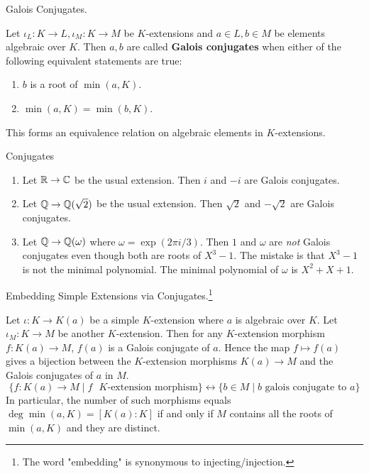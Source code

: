 \documentclass[../book.tex]{subfiles}
\begin{document}
\begin{dfn} Galois Conjugates.

    Let $\iota_L : K \to L, \iota_M : K \to M$ be $K$-extensions and
    $a \in L, b \in M$ be elements algebraic over $K$. 
    Then $a, b$ are called \textbf{Galois conjugates} when
    either of the following equivalent statements are true: 
    \begin{enumerate}
        \item $b$ is a root of $\min(a,K)$.
        \item $\min(a,K) = \min(b,K)$.
    \end{enumerate}
    This forms an equivalence relation on algebraic elements in $K$-extensions.
\end{dfn}
\begin{eg} Conjugates
    \begin{enumerate}
        \item Let $\mathbb{R} \to \mathbb{C}$ be the usual extension.
        Then $i$ and $-i$ are Galois conjugates.
        \item Let $\mathbb{Q} \to \mathbb{Q}(\sqrt{2})$ be the usual extension.
        Then $\sqrt{2}$ and $-\sqrt{2}$ are Galois conjugates.
        \item Let $\mathbb{Q} \to \mathbb{Q}(\omega)$ where $\omega = \exp(2\pi i / 3)$.
        Then $1$ and $\omega$ are \emph{not} Galois conjugates even though
        both are roots of $X^3 - 1$. 
        The mistake is that $X^3 - 1$ is not the minimal polynomial.
        The minimal polynomial of $\omega$ is $X^2 + X + 1$. 
    \end{enumerate}
\end{eg}
\begin{lem} Embedding Simple Extensions via Conjugates.\footnote{
    The word "embedding" is synonymous to injecting/injection.}
    
    Let $\iota : K \to K(a)$ be a simple $K$-extension
    where $a$ is algebraic over $K$. 
    Let $\iota_M : K \to M$ be another $K$-extension.
    Then for any $K$-extension morphism $f : K(a) \to M$, 
    $f(a)$ is a Galois conjugate of $a$.
    Hence the map $f \mapsto f(a)$ gives a bijection between
    the $K$-extension morphisms $K(a) \to M$ and the Galois conjugates of $a$ in $M$.
    \[
        \{f : K(a) \to M \mid f \text{ $K$-extension morphism} \} \leftrightarrow 
        \{b \in M \mid b \text{ galois conjugate to } a \}
    \]
    In particular, the number of such morphisms equals $\deg \min(a,K) = [K(a) : K]$ 
    if and only if $M$ contains all the roots of $\min(a,K)$ and they are distinct. 
\end{lem}
\end{document}
